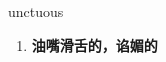 
\begin{frame}
{\huge unctuous}
\begin{center}
\begin{enumerate}\Large
  \item \textbf{油嘴滑舌的，谄媚的}
\end{enumerate}
\end{center}
\end{frame}
